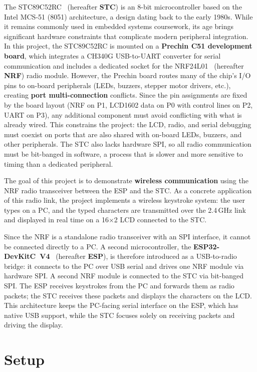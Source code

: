 \documentclass[12pt, a4paper]{article}
\begin{document}
The STC89C52RC~\cite{stc89c52} (hereafter \textbf{STC}) is an 8-bit microcontroller based on the Intel MCS-51 (8051) architecture, a design dating back to the early 1980s. While it remains commonly used in embedded systems coursework, its age brings significant hardware constraints that complicate modern peripheral integration. In this project, the STC89C52RC is mounted on a \textbf{Prechin C51 development board}, which integrates a CH340G USB-to-UART converter for serial communication and includes a dedicated socket for the NRF24L01~\cite{nrf24l01} (hereafter \textbf{NRF}) radio module. However, the Prechin board routes many of the chip's I/O pins to on-board peripherals (LEDs, buzzers, stepper motor drivers, etc.), creating \textbf{port multi-connection} conflicts. Since the pin assignments are fixed by the board layout (NRF on P1, LCD1602 data on P0 with control lines on P2, UART on P3), any additional component must avoid conflicting with what is already wired. This constrains the project: the LCD, radio, and serial debugging must coexist on ports that are also shared with on-board LEDs, buzzers, and other peripherals. The STC also lacks hardware SPI, so all radio communication must be bit-banged in software, a process that is slower and more sensitive to timing than a dedicated peripheral.

The goal of this project is to demonstrate \textbf{wireless communication} using the NRF radio transceiver between the ESP and the STC. As a concrete application of this radio link, the project implements a wireless keystroke system: the user types on a PC, and the typed characters are transmitted over the 2.4\,GHz link and displayed in real time on a 16$\times$2 LCD connected to the STC.

Since the NRF is a standalone radio transceiver with an SPI interface, it cannot be connected directly to a PC. A second microcontroller, the \textbf{ESP32-DevKitC~V4}~\cite{esp32} (hereafter \textbf{ESP}), is therefore introduced as a USB-to-radio bridge: it connects to the PC over USB serial and drives one NRF module via hardware SPI. A second NRF module is connected to the STC via bit-banged SPI. The ESP receives keystrokes from the PC and forwards them as radio packets; the STC receives these packets and displays the characters on the LCD. This architecture keeps the PC-facing serial interface on the ESP, which has native USB support, while the STC focuses solely on receiving packets and driving the display.

\section{Setup}
\end{document}
